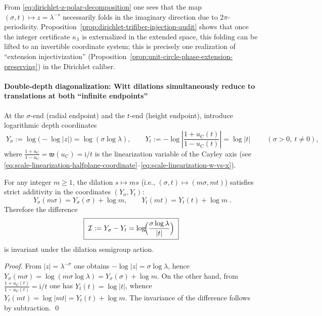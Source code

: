\begin{remark}
From \eqref{eq:dirichlet-z-polar-decomposition} one sees that the map \((\sigma,t)\mapsto z=\lambda^{-s}\) necessarily folds in the imaginary direction due to \(2\pi\)-periodicity.
Proposition~\ref{prop:dirichlet-trifiber-injection-audit} shows that once the integer certificate \(\kappa_{\lambda}\) is externalized in the extended space, this folding can be lifted to an invertible coordinate system;
this is precisely one realization of ``extension injectivization'' (Proposition~\ref{prop:unit-circle-phase-extension-preserving}) in the Dirichlet caliber.
\end{remark}

\paragraph{Double-depth diagonalization: Witt dilations simultaneously reduce to translations at both ``infinite endpoints''}
At the \(\sigma\)-end (radial endpoint) and the \(t\)-end (height endpoint), introduce logarithmic depth coordinates
\begin{equation}\label{eq:dirichlet-double-depth-coordinates}
\boxed{\;
Y_{\sigma}:=\log\!\bigl(-\log|z|\bigr)=\log(\sigma\log\lambda),
\qquad
Y_{t}:=-\log\left|\frac{1+u_{\mathrm C}(t)}{1-u_{\mathrm C}(t)}\right|=\log|t|\; }
\qquad(\sigma>0,\ t\neq 0),
\end{equation}
where \(\frac{1+u_{\mathrm C}}{1-u_{\mathrm C}}=\mathfrak{w}(u_{\mathrm C})=\mathrm{i}/t\) is the linearization variable of the Cayley axis (see \eqref{eq:scale-linearization-halfplane-coordinate}--\eqref{eq:scale-linearization-w-vs-x}).

\begin{theorem}\label{thm:dirichlet-double-depth-translation}
For any integer \(m\ge 1\), the dilation \(s\mapsto ms\) (i.e., \((\sigma,t)\mapsto(m\sigma,mt)\)) satisfies strict additivity in the coordinates \((Y_{\sigma},Y_{t})\):
\begin{equation}\label{eq:dirichlet-double-depth-translation}
\boxed{\;
Y_{\sigma}(m\sigma)=Y_{\sigma}(\sigma)+\log m,
\qquad
Y_{t}(mt)=Y_{t}(t)+\log m\; }.
\end{equation}
Therefore the difference
\begin{equation}\label{eq:dirichlet-ray-invariant}
\boxed{\;\mathcal{I}:=Y_{\sigma}-Y_{t}=\log\!\Bigl(\frac{\sigma\log\lambda}{|t|}\Bigr)\;}
\end{equation}
is invariant under the dilation semigroup action.
\end{theorem}
\begin{proof}
From \(|z|=\lambda^{-\sigma}\) one obtains \(-\log|z|=\sigma\log\lambda\), hence
\(
Y_{\sigma}(m\sigma)=\log(m\sigma\log\lambda)=Y_{\sigma}(\sigma)+\log m
\).
On the other hand, from \(\frac{1+u_{\mathrm C}(t)}{1-u_{\mathrm C}(t)}=\mathrm{i}/t\) one has \(Y_t(t)=\log|t|\), whence
\(
Y_{t}(mt)=\log|mt|=Y_{t}(t)+\log m
\).
The invariance of the difference follows by subtraction. \qed
\end{proof}

